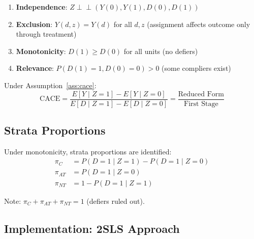 \begin{assumption}
\label{ass:cace}
\begin{enumerate}
\item \textbf{Independence}: $Z \perp\!\!\!\perp (Y(0), Y(1), D(0), D(1))$
\item \textbf{Exclusion}: $Y(d, z) = Y(d)$ for all $d, z$ (assignment affects outcome only through treatment)
\item \textbf{Monotonicity}: $D(1) \geq D(0)$ for all units (no defiers)
\item \textbf{Relevance}: $P(D(1) = 1, D(0) = 0) > 0$ (some compliers exist)
\end{enumerate}
\end{assumption}

\begin{proposition}[CACE = LATE]
Under Assumption~\ref{ass:cace}:
\begin{equation}
\text{CACE} = \frac{E[Y \mid Z = 1] - E[Y \mid Z = 0]}{E[D \mid Z = 1] - E[D \mid Z = 0]} = \frac{\text{Reduced Form}}{\text{First Stage}}
\end{equation}
\end{proposition}

\subsection{Strata Proportions}

Under monotonicity, strata proportions are identified:
\begin{align}
\pi_C &= P(D = 1 \mid Z = 1) - P(D = 1 \mid Z = 0) \label{eq:pi-c}\\
\pi_{AT} &= P(D = 1 \mid Z = 0) \label{eq:pi-at}\\
\pi_{NT} &= 1 - P(D = 1 \mid Z = 1) \label{eq:pi-nt}
\end{align}

Note: $\pi_C + \pi_{AT} + \pi_{NT} = 1$ (defiers ruled out).

\subsection{Implementation: 2SLS Approach}

